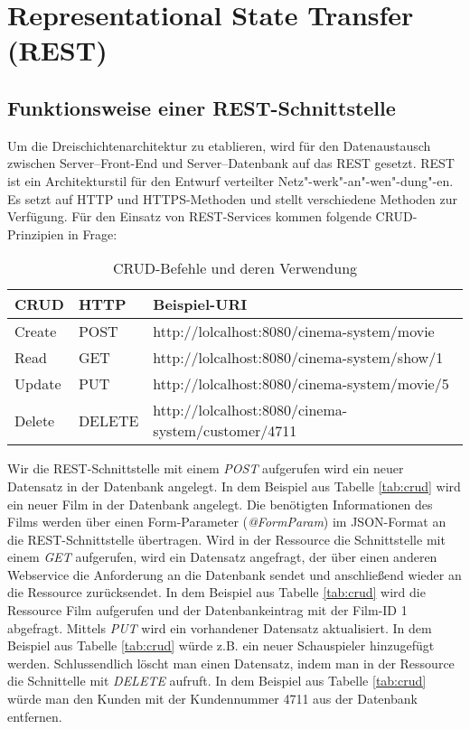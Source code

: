 \section{Representational State Transfer (REST)}
\label{sec:rest}

\subsection{Funktionsweise einer \acs{REST}-Schnittstelle}
Um die Dreischichtenarchitektur zu etablieren, wird für den Datenaustausch zwischen Server--Front-End und Server--Datenbank auf das \acf{REST} gesetzt.
\acs{REST} ist ein Architekturstil für den Entwurf verteilter Netz"-werk"-an"-wen"-dung"-en.
Es setzt auf \acs{HTTP} und \acs{HTTPS}-Methoden und stellt verschiedene Methoden zur Verfügung.
Für den Einsatz von \acs{REST}-Services kommen folgende \acs{CRUD}-Prinzipien in Frage:

\begin{table}[ht]
	\renewcommand{\arraystretch}{1.2}
	\centering
	\begin{tabular}{l|l|l}
		\acs{CRUD} & \acs{HTTP} & Beispiel-\acs{URI} \\
		\hline
		Create & POST & http://lolcalhost:8080/cinema-system/movie \\
		Read & GET & http://lolcalhost:8080/cinema-system/show/1 \\
		Update & PUT & http://lolcalhost:8080/cinema-system/movie/5 \\
		Delete & DELETE & http://lolcalhost:8080/cinema-system/customer/4711 \\
	\end{tabular}
	\caption{\acs{CRUD}-Befehle und deren Verwendung}
	\label{tab:crud}
\end{table}

Wir die \acs{REST}-Schnittstelle mit einem \textit{POST} aufgerufen wird ein neuer Datensatz in der Datenbank angelegt.
In dem Beispiel aus Tabelle \vref{tab:crud} wird ein neuer Film in der Datenbank angelegt.
Die benötigten Informationen des Films werden über einen Form-Parameter (\textit{@FormParam}) im \acs{JSON}-Format an die \acs{REST}-Schnittstelle übertragen. %
Wird in der Ressource die Schnittstelle mit einem \textit{GET} aufgerufen, wird ein Datensatz angefragt, der über einen anderen Webservice die Anforderung an die Datenbank sendet und anschließend wieder an die Ressource zurücksendet.
In dem Beispiel aus Tabelle \vref{tab:crud} wird die Ressource Film aufgerufen und der Datenbankeintrag mit der Film-ID 1 abgefragt.
Mittels \textit{PUT} wird ein vorhandener Datensatz aktualisiert.
In dem Beispiel aus Tabelle \vref{tab:crud} würde z.B. ein neuer Schauspieler hinzugefügt werden.
Schlussendlich löscht man einen Datensatz, indem man in der Ressource die Schnittelle mit \textit{DELETE} aufruft.
In dem Beispiel aus Tabelle \vref{tab:crud} würde man den Kunden mit der Kundennummer 4711 aus der Datenbank entfernen.\\


